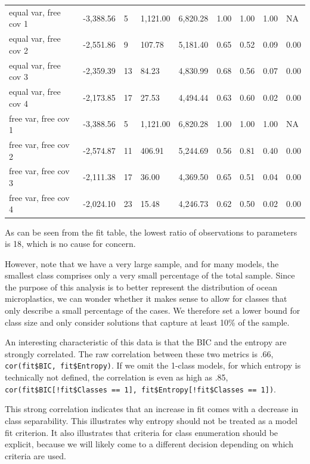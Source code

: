 \documentclass[
  man,floatsintext]{apa6}
\begin{document}
\begin{table}[tbp]
\begin{center}
\begin{threeparttable}
\begin{tabular}{lllllllll}
equal var, free cov 1 & -3,388.56 & 5 & 1,121.00 & 6,820.28 & 1.00 & 1.00 & 1.00 & NA\\
equal var, free cov 2 & -2,551.86 & 9 & 107.78 & 5,181.40 & 0.65 & 0.52 & 0.09 & 0.00\\
equal var, free cov 3 & -2,359.39 & 13 & 84.23 & 4,830.99 & 0.68 & 0.56 & 0.07 & 0.00\\
equal var, free cov 4 & -2,173.85 & 17 & 27.53 & 4,494.44 & 0.63 & 0.60 & 0.02 & 0.00\\
free var, free cov 1 & -3,388.56 & 5 & 1,121.00 & 6,820.28 & 1.00 & 1.00 & 1.00 & NA\\
free var, free cov 2 & -2,574.87 & 11 & 406.91 & 5,244.69 & 0.56 & 0.81 & 0.40 & 0.00\\
free var, free cov 3 & -2,111.38 & 17 & 36.00 & 4,369.50 & 0.65 & 0.51 & 0.04 & 0.00\\
free var, free cov 4 & -2,024.10 & 23 & 15.48 & 4,246.73 & 0.62 & 0.50 & 0.02 & 0.00\\
\bottomrule
\end{tabular}

\end{threeparttable}
\end{center}

\end{table}

As can be seen from the fit table,
the lowest ratio of observations to parameters is 18, which is no cause for concern.

However, note that we have a very large sample, and for many models, the smallest class comprises only a very small percentage of the total sample.
Since the purpose of this analysis is to better represent the distribution of ocean microplastics, we can wonder whether it makes sense to allow for classes that only describe a small percentage of the cases.
We therefore set a lower bound for class size and only consider solutions that capture at least 10\% of the sample.

An interesting characteristic of this data is that
the BIC and the entropy are strongly correlated.
The raw correlation between these two metrics is .66, \texttt{cor(fit\$BIC,\ fit\$Entropy)}.
If we omit the 1-class models, for which entropy is technically not defined,
the correlation is even as high as .85, \texttt{cor(fit\$BIC{[}!fit\$Classes\ ==\ 1{]},\ fit\$Entropy{[}!fit\$Classes\ ==\ 1{]})}.

This strong correlation indicates that an increase in fit comes with a decrease in class separability.
This illustrates why entropy should not be treated as a model fit criterion.
It also illustrates that criteria for class enumeration should be explicit,
because we will likely come to a different decision depending on which criteria are used.
\end{document}
